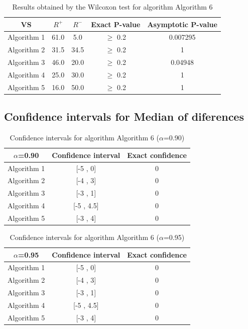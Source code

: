 \documentclass[a4paper,10pt]{article}
\begin{document}
\begin{table}[!htp]
\centering\small
\begin{tabular}{
|c|c|c|c|c|}
\hline
 VS & $R^{+}$ & $R^{-}$ & Exact P-value & Asymptotic P-value \\ \hline 
Algorithm 1 & 61.0 & 5.0 & $\geq$ 0.2 & 0.007295\\ \hline 
Algorithm 2 & 31.5 & 34.5 & $\geq$ 0.2 & 1\\ \hline 
Algorithm 3 & 46.0 & 20.0 & $\geq$ 0.2 & 0.04948\\ \hline 
Algorithm 4 & 25.0 & 30.0 & $\geq$ 0.2 & 1\\ \hline 
Algorithm 5 & 16.0 & 50.0 & $\geq$ 0.2 & 1\\ \hline 

\end{tabular}
\caption{Results obtained by the Wilcoxon test for algorithm Algorithm 6}
\end{table}

\subsection{Confidence intervals for Median of diferences}

\begin{table}[!htp]
\centering\small
\begin{tabular}{
|c|c|c|}
\hline
 $\alpha$=0.90 & Confidence interval & Exact confidence \\ \hline 
Algorithm 1 & [-5 , 0] & 0\\ \hline 
Algorithm 2 & [-4 , 3] & 0\\ \hline 
Algorithm 3 & [-3 , 1] & 0\\ \hline 
Algorithm 4 & [-5 , 4.5] & 0\\ \hline 
Algorithm 5 & [-3 , 4] & 0\\ \hline 

\end{tabular}
\caption{Confidence intervals for algorithm Algorithm 6 ($\alpha$=0.90)}
\end{table}
\begin{table}[!htp]
\centering\small
\begin{tabular}{
|c|c|c|}
\hline
 $\alpha$=0.95 & Confidence interval & Exact confidence \\ \hline 
Algorithm 1 & [-5 , 0] & 0\\ \hline 
Algorithm 2 & [-4 , 3] & 0\\ \hline 
Algorithm 3 & [-3 , 1] & 0\\ \hline 
Algorithm 4 & [-5 , 4.5] & 0\\ \hline 
Algorithm 5 & [-3 , 4] & 0\\ \hline 

\end{tabular}
\caption{Confidence intervals for algorithm Algorithm 6 ($\alpha$=0.95)}
\end{table}

 \clearpage 
\end{document}
